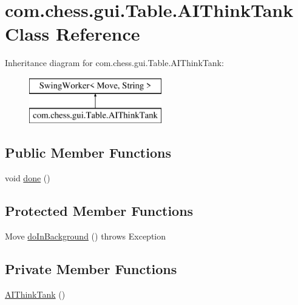 \hypertarget{classcom_1_1chess_1_1gui_1_1_table_1_1_a_i_think_tank}{}\section{com.\+chess.\+gui.\+Table.\+A\+I\+Think\+Tank Class Reference}
\label{classcom_1_1chess_1_1gui_1_1_table_1_1_a_i_think_tank}
Inheritance diagram for com.\+chess.\+gui.\+Table.\+A\+I\+Think\+Tank\+:\begin{figure}[H]
\begin{center}
\leavevmode
\includegraphics[height=2.000000cm]{classcom_1_1chess_1_1gui_1_1_table_1_1_a_i_think_tank}
\end{center}
\end{figure}
\subsection*{Public Member Functions}
\begin{DoxyCompactItemize}
\item 
void \mbox{\hyperlink{classcom_1_1chess_1_1gui_1_1_table_1_1_a_i_think_tank_aecaf221bbac009428cf16904bcf05c25}{done}} ()
\end{DoxyCompactItemize}
\subsection*{Protected Member Functions}
\begin{DoxyCompactItemize}
\item 
Move \mbox{\hyperlink{classcom_1_1chess_1_1gui_1_1_table_1_1_a_i_think_tank_ab87c264e9e041eaeb4cb9e54510b7cab}{do\+In\+Background}} ()  throws Exception 
\end{DoxyCompactItemize}
\subsection*{Private Member Functions}
\begin{DoxyCompactItemize}
\item 
\mbox{\hyperlink{classcom_1_1chess_1_1gui_1_1_table_1_1_a_i_think_tank_a84c966a13e67e9c2e8fd03a737520c1c}{A\+I\+Think\+Tank}} ()
\end{DoxyCompactItemize}


